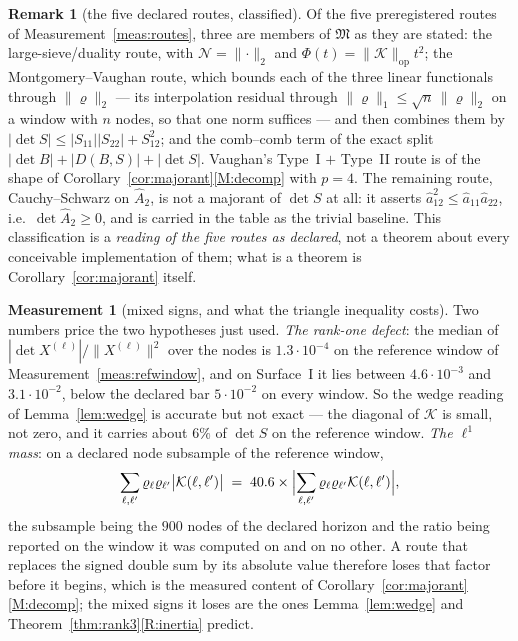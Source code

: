\documentclass[11pt,a4paper]{article}
\theoremstyle{plain}
\theoremstyle{definition}
\newtheorem{remark}[theorem]{Remark}
\newtheorem{measurement}[theorem]{Measurement}
\newcommand{\Ah}{\widehat{A}}
\newcommand{\ah}{\widehat{a}}
\begin{document}
\begin{remark}[the five declared routes, classified]
\label{rem:routeclass}
Of the five preregistered routes of Measurement~\ref{meas:routes}, three are
members of $\mathfrak M$ as they are stated: the large-sieve/duality route, with
$\mathcal N=\lVert\cdot\rVert_2$ and
$\Phi(t)=\lVert\mathcal K\rVert_{\mathrm{op}}t^{2}$; the
Montgomery--Vaughan route, which bounds each of the three linear functionals
through $\lVert\varrho\rVert_2$ --- its interpolation residual through
$\lVert\varrho\rVert_1\le\sqrt n\,\lVert\varrho\rVert_2$ on a window with $n$
nodes, so that one norm suffices --- and then combines them by
$|\det S|\le|S_{11}||S_{22}|+S_{12}^{2}$; and the comb--comb term of the exact
split $|\det B|+|D(B,S)|+|\det S|$. Vaughan's Type~I $+$ Type~II route is of
the shape of Corollary~\ref{cor:majorant}\ref{M:decomp} with $p=4$. The
remaining route, Cauchy--Schwarz on $\Ah_2$, is not a majorant of $\det S$ at
all: it asserts $\ah_{12}^{2}\le\ah_{11}\ah_{22}$, i.e.\ $\det\Ah_2\ge0$, and
is carried in the table as the trivial baseline. This classification is a
\emph{reading of the five routes as declared}, not a theorem about every
conceivable implementation of them; what is a theorem is
Corollary~\ref{cor:majorant} itself.
\end{remark}

\begin{measurement}[mixed signs, and what the triangle inequality costs]
\label{meas:l1}
Two numbers price the two hypotheses just used. \emph{The rank-one defect}: the
median of $|\det X^{(\ell)}|/\lVert X^{(\ell)}\rVert^{2}$ over the nodes is
$1.3\cdot10^{-4}$ on the reference window of
Measurement~\ref{meas:refwindow}, and on Surface~I it lies between
$4.6\cdot10^{-3}$ and $3.1\cdot10^{-2}$, below the declared bar
$5\cdot10^{-2}$ on every window. So the wedge reading of
Lemma~\ref{lem:wedge} is accurate but not exact --- the diagonal of
$\mathcal K$ is small, not zero, and it carries about $6\%$ of $\det S$ on the
reference window. \emph{The $\ell^{1}$ mass}: on a declared node
subsample of the reference window,
\begin{equation}
\label{eq:l1mass}
  \sum_{\ell,\ell'}\varrho_\ell\varrho_{\ell'}
  \bigl|\mathcal K(\ell,\ell')\bigr|
  \;=\;40.6\times
  \Bigl|\sum_{\ell,\ell'}\varrho_\ell\varrho_{\ell'}
  \mathcal K(\ell,\ell')\Bigr| ,
\end{equation}
the subsample being the $900$ nodes of the declared horizon and the ratio being
reported on the window it was computed on and on no other. A
route that replaces the signed double sum by its absolute value therefore loses
that factor before it begins, which is the measured content of
Corollary~\ref{cor:majorant}\ref{M:decomp}; the mixed signs it loses are the
ones Lemma~\ref{lem:wedge} and Theorem~\ref{thm:rank3}\ref{R:inertia} predict.
\end{measurement}
\end{document}
